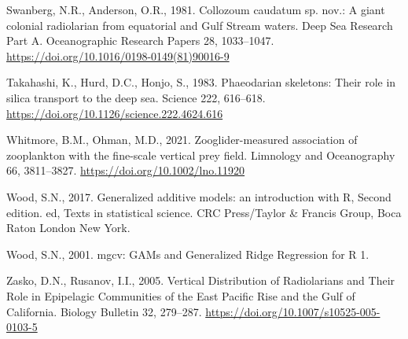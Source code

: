 \documentclass[
]{article}
\newlength{\cslhangindent}
\newlength{\cslentryspacingunit} %
\newenvironment{CSLReferences}[2] %
 {%
  \setlength{\parindent}{0pt}
  \ifodd #1
  \let\oldpar\par
  \def\par{\hangindent=\cslhangindent\oldpar}
  \fi
  \setlength{\parskip}{#2\cslentryspacingunit}
 }%
 {}
\begin{document}
\begin{CSLReferences}{1}{0}
\leavevmode{}%
Swanberg, N.R., Anderson, O.R., 1981. Collozoum caudatum sp. nov.: A
giant colonial radiolarian from equatorial and Gulf Stream waters. Deep
Sea Research Part A. Oceanographic Research Papers 28, 1033--1047.
\url{https://doi.org/10.1016/0198-0149(81)90016-9}

\leavevmode{}%
Takahashi, K., Hurd, D.C., Honjo, S., 1983. Phaeodarian skeletons: Their
role in silica transport to the deep sea. Science 222, 616--618.
\url{https://doi.org/10.1126/science.222.4624.616}

\leavevmode{}%
Whitmore, B.M., Ohman, M.D., 2021. Zooglider-measured association of
zooplankton with the fine-scale vertical prey field. Limnology and
Oceanography 66, 3811--3827. \url{https://doi.org/10.1002/lno.11920}

\leavevmode{}%
Wood, S.N., 2017. Generalized additive models: an introduction with R,
Second edition. ed, Texts in statistical science. CRC Press/Taylor \&
Francis Group, Boca Raton London New York.

\leavevmode{}%
Wood, S.N., 2001. mgcv: GAMs and Generalized Ridge Regression for R 1.

\leavevmode{}%
Zasko, D.N., Rusanov, I.I., 2005. Vertical Distribution of Radiolarians
and Their Role in Epipelagic Communities of the East Pacific Rise and
the Gulf of California. Biology Bulletin 32, 279--287.
\url{https://doi.org/10.1007/s10525-005-0103-5}

\end{CSLReferences}
\end{document}
